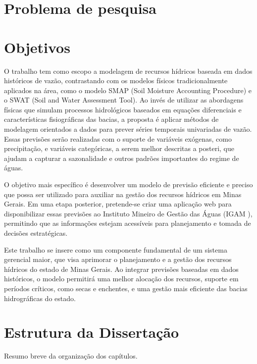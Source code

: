 \section{Problema de pesquisa}

\section{Objetivos}

O trabalho tem como escopo a modelagem de recursos hídricos baseada em dados históricos de vazão, contrastando com os modelos físicos tradicionalmente aplicados na área, como o modelo SMAP (Soil Moisture Accounting Procedure) e o SWAT (Soil and Water Assessment Tool). Ao invés de utilizar as abordagens físicas que simulam processos hidrológicos baseados em equações diferenciais e características fisiográficas das bacias, a proposta é aplicar métodos de modelagem orientados a dados para prever séries temporais univariadas de vazão. Essas previsões serão realizadas com o suporte de variáveis exógenas, como precipitação, e variáveis categóricas, a serem melhor descritas a posteri, que ajudam a capturar a sazonalidade e outros padrões importantes do regime de águas.

O objetivo mais específico é desenvolver um modelo de previsão eficiente e preciso que possa ser utilizado para auxiliar na gestão dos recursos hídricos em Minas Gerais. Em uma etapa posterior, pretende-se criar uma aplicação web para disponibilizar essas previsões ao Instituto Mineiro de Gestão das Águas (IGAM \cite{igam_site_2024}), permitindo que as informações estejam acessíveis para planejamento e tomada de decisões estratégicas.

Este trabalho se insere como um componente fundamental de um sistema gerencial maior, que visa aprimorar o planejamento e a gestão dos recursos hídricos do estado de Minas Gerais. Ao integrar previsões baseadas em dados históricos, o modelo permitirá uma melhor alocação dos recursos, suporte em períodos críticos, como secas e enchentes, e uma gestão mais eficiente das bacias hidrográficas do estado. 

\section{Estrutura da Dissertação}
Resumo breve da organização dos capítulos.